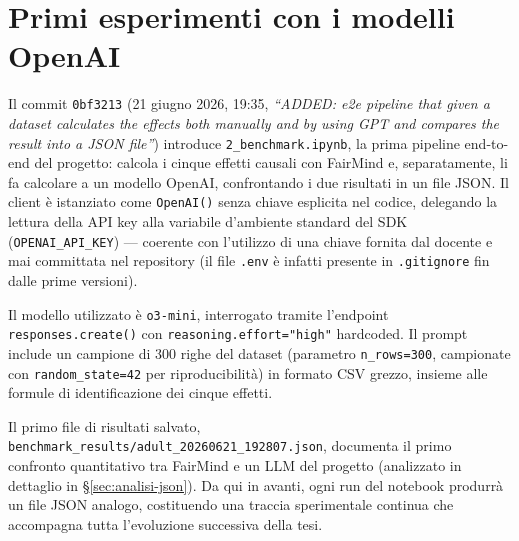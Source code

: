 \section{Primi esperimenti con i modelli OpenAI}
\label{sec:openai}

Il commit \texttt{0bf3213} (21 giugno 2026, 19:35, \emph{``ADDED: e2e pipeline that given a dataset calculates the effects both manually and by using GPT and compares the result into a JSON file''}) introduce \texttt{2\_benchmark.ipynb}, la prima pipeline end-to-end del progetto: calcola i cinque effetti causali con FairMind e, separatamente, li fa calcolare a un modello OpenAI, confrontando i due risultati in un file JSON. Il client è istanziato come \texttt{OpenAI()} senza chiave esplicita nel codice, delegando la lettura della API key alla variabile d'ambiente standard del SDK (\texttt{OPENAI\_API\_KEY}) --- coerente con l'utilizzo di una chiave fornita dal docente e mai committata nel repository (il file \texttt{.env} è infatti presente in \texttt{.gitignore} fin dalle prime versioni).

Il modello utilizzato è \texttt{o3-mini}, interrogato tramite l'endpoint \texttt{responses.create()} con \texttt{reasoning.effort="high"} hardcoded. Il prompt include un campione di 300 righe del dataset (parametro \texttt{n\_rows=300}, campionate con \texttt{random\_state=42} per riproducibilità) in formato CSV grezzo, insieme alle formule di identificazione dei cinque effetti.

Il primo file di risultati salvato, \texttt{benchmark\_results/adult\_20260621\_192807.json}, documenta il primo confronto quantitativo tra FairMind e un LLM del progetto (analizzato in dettaglio in \S\ref{sec:analisi-json}). Da qui in avanti, ogni run del notebook produrrà un file JSON analogo, costituendo una traccia sperimentale continua che accompagna tutta l'evoluzione successiva della tesi.
